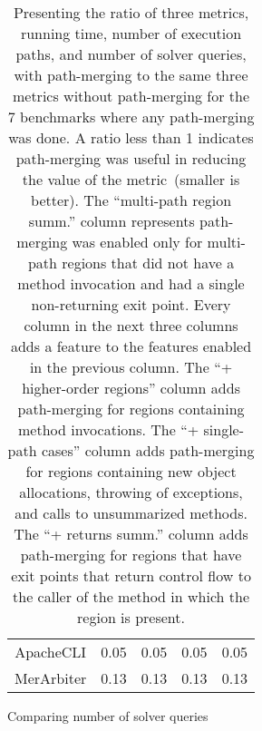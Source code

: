 \begin{table}
\begin{subtable}[t]{0.50\textwidth}
\begin{tabular}{@{}ccccc@{}}
                ApacheCLI                                                & 0.05                                                              & 0.05                                                             & 0.05                                                           & 0.05                                                     \\
                MerArbiter                                               & 0.13                                                              & 0.13                                                             & 0.13                                                           & 0.13                                                     \\ \bottomrule
            \end{tabular}
        \caption{Comparing number of solver queries}
        \label{table:numqueries-comparison}
    \end{subtable}

    \caption{Presenting the ratio of three metrics, running time, number of execution paths, and number of solver queries,
with path-merging to the same three metrics without path-merging for the 7 benchmarks where any path-merging was done. A
ratio less than 1 indicates path-merging was useful in reducing the value of the metric~(smaller is better). The
``multi-path region summ.'' column represents path-merging was enabled only for multi-path regions that did not have a
method invocation and had a single non-returning exit point. Every column in the next three columns adds a feature to
the features enabled in the previous column. The ``+ higher-order regions'' column adds path-merging for regions
containing method invocations. The ``+ single-path cases'' column adds path-merging for regions containing new object
allocations, throwing of exceptions, and calls to unsummarized methods. The ``+ returns summ.'' column adds path-merging
for regions that have exit points that return control flow to the caller of the method in which the region is present.}
    \label{tab:comparison-table}
\end{table}